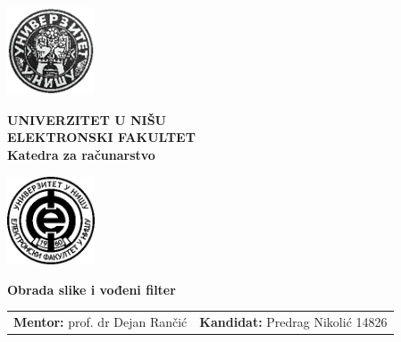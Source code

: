 \documentclass[a4paper,12pt,titlepage]{article}
\begin{document}
\begin{titlepage}
    \begin{center}
    
        \includegraphics[width=2.6cm]{img/uni.png}%
        \begin{minipage}[b]{0.7\textwidth}
            \centering
            \Large
            \textbf{UNIVERZITET U NIŠU\\ ELEKTRONSKI FAKULTET\\}       
            \large
            \textbf{Katedra za računarstvo}
        \end{minipage}%
        \includegraphics[width=2.6cm]{img/elfak.png}
        
              
      
        \vspace{5cm}
        \Large
        \textbf{Obrada slike i vođeni filter}
        
        \vspace{0.6cm}
        \normalsize
    \end{center}
    
    \vspace{1cm}
   
    
    
    
    \vspace{10cm}
    
    \noindent \begin{tabu} to 
        \textbf{Mentor:} prof. dr Dejan Rančić &
        \textbf{Kandidat:} Predrag Nikolić 14826
    \end{tabu}
    

\end{titlepage}
\end{document}
